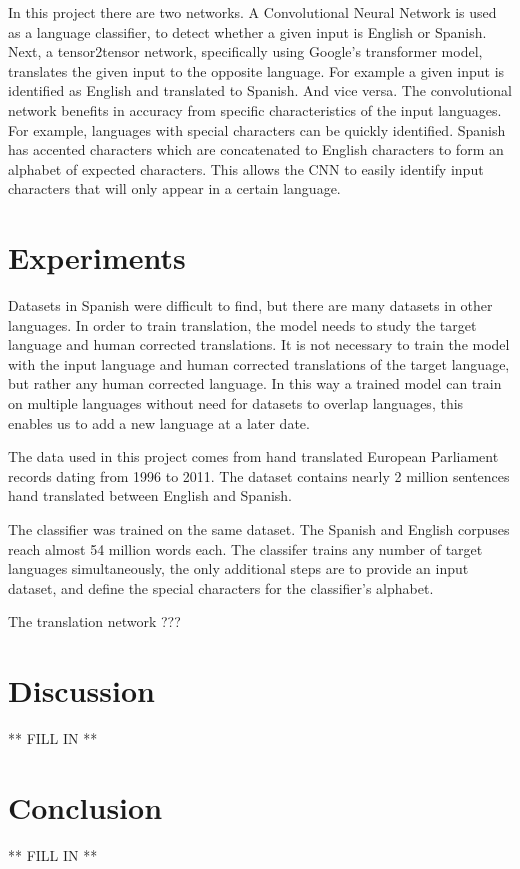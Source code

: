 \documentclass[10pt,a4paper]{article}
\begin{document}
  In this project there are two networks. A Convolutional Neural Network is used as a language classifier, to detect whether a given input is English or Spanish. Next, a tensor2tensor network, specifically using Google's transformer model, translates the given input to the opposite language. For example a given input is identified as English and translated to Spanish. And vice versa.
  The convolutional network benefits in accuracy from specific characteristics of the input languages. For example, languages with special characters can be quickly identified. Spanish has accented characters which are concatenated to English characters to form an alphabet of expected characters. This allows the CNN to easily identify input characters that will only appear in a certain language.

\section{Experiments}

  Datasets in Spanish were difficult to find, but there are many datasets in other languages. In order to train translation, the model needs to study the target language and human corrected translations. It is not necessary to train the model with the input language and human corrected translations of the target language, but rather any human corrected language. In this way a trained model can train on multiple languages without need for datasets to overlap languages, this enables us to add a new language at a later date.

  The data used in this project comes from hand translated European Parliament records dating from 1996 to 2011. The dataset contains nearly 2 million sentences hand translated between English and Spanish.

  The classifier was trained on the same dataset. The Spanish and English corpuses reach almost 54 million words each. The classifer trains any number of target languages simultaneously, the only additional steps are to provide an input dataset, and define the special characters for the classifier's alphabet.
  
  The translation network ???

\clearpage

\section{Discussion}
** FILL IN **

\section{Conclusion}
** FILL IN **
\end{document}

